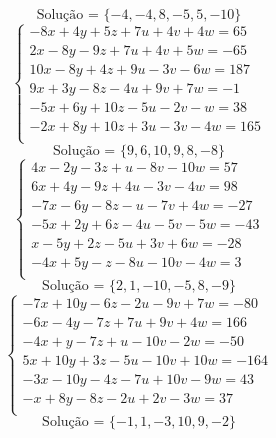 \documentclass[12pt,oneside,a4paper]{article}
\begin{document}
\begin{equation*}
\text{Solução = }\{-4,-4,8,-5,5,-10\}
\end{equation*}
\vspace{\baselineskip}
\begin{equation*}
\begin{cases}
-8x+4y+5z+7u+4v+4w=65 \\
2x-8y-9z+7u+4v+5w=-65 \\
10x-8y+4z+9u-3v-6w=187 \\
9x+3y-8z-4u+9v+7w=-1 \\
-5x+6y+10z-5u-2v-w=38 \\
-2x+8y+10z+3u-3v-4w=165 \\
\end{cases}
\end{equation*}
\begin{equation*}
\text{Solução = }\{9,6,10,9,8,-8\}
\end{equation*}
\vspace{\baselineskip}
\begin{equation*}
\begin{cases}
4x-2y-3z+u-8v-10w=57 \\
6x+4y-9z+4u-3v-4w=98 \\
-7x-6y-8z-u-7v+4w=-27 \\
-5x+2y+6z-4u-5v-5w=-43 \\
x-5y+2z-5u+3v+6w=-28 \\
-4x+5y-z-8u-10v-4w=3 \\
\end{cases}
\end{equation*}
\begin{equation*}
\text{Solução = }\{2,1,-10,-5,8,-9\}
\end{equation*}
\vspace{\baselineskip}
\begin{equation*}
\begin{cases}
-7x+10y-6z-2u-9v+7w=-80 \\
-6x-4y-7z+7u+9v+4w=166 \\
-4x+y-7z+u-10v-2w=-50 \\
5x+10y+3z-5u-10v+10w=-164 \\
-3x-10y-4z-7u+10v-9w=43 \\
-x+8y-8z-2u+2v-3w=37 \\
\end{cases}
\end{equation*}
\begin{equation*}
\text{Solução = }\{-1,1,-3,10,9,-2\}
\end{equation*}
\end{document}
